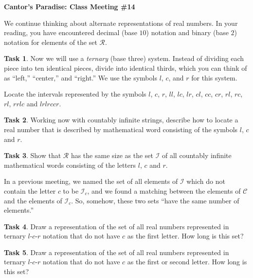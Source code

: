 \documentclass[12pt]{amsart}
\theoremstyle{definition}
\newtheorem{task}{Task}
\begin{document}
\begin{center}
\textbf{\Huge
Cantor's Paradise: Class Meeting \#14
}
\end{center}


\vspace{.5in}


We continue thinking about alternate representations of real numbers.
In your reading, you have encountered decimal (base $10$) notation and binary (base $2$) notation for elements of the set $\mathcal{R}$.

\begin{task}
Now we will use a \emph{ternary} (base three) system. Instead of dividing each piece into ten identical pieces, divide into identical thirds, which you can think of as ``left,'' ``center,'' and ``right.''
We use the symbols $l$, $c$, and $r$ for this system.

Locate the intervals represented by the symbols $l$, $c$, $r$, $ll$, $lc$, $lr$, $cl$, $cc$, $cr$, $rl$, $rc$, $rl$, $rrlc$ and $lrlrccr$.
\end{task}

\begin{task}
Working now with countably infinite strings, describe how to locate a real number that is described by mathematical word consisting of the symbols $l$, $c$ and $r$.\\
\end{task}

\begin{task}
Show that $\mathcal{R}$ has the same size as the set $\mathcal{I}$ of all countably infinite mathematical words consisting of the letters $l$, $c$ and $r$.\\
\end{task}

In a previous meeting, we named the set of all elements of $\mathcal{I}$ which do not contain the letter $c$ to be $\mathcal{I}_c$, and we found a matching between the elements of $\mathcal{C}$ and the elements of $\mathcal{I}_c$.
So, somehow, these two sets ``have the same number of elements.''\\

\begin{task}
Draw a representation of the set of all real numbers represented in ternary $l$-$c$-$r$ notation that do not have $c$ as the first letter.
How long is this set?\\
\end{task}

\begin{task}
Draw a representation of the set of all real numbers represented in ternary $l$-$c$-$r$ notation that do not have $c$ as the first or second letter. How long is this set? \\
\end{task}
\end{document}
